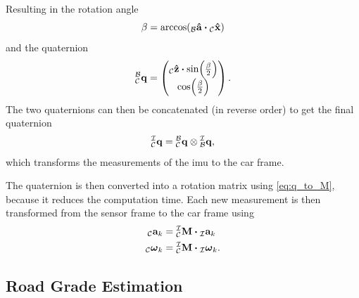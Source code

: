 Resulting in the rotation angle
\begin{equation}
	\beta = \arccos(\vincs{\vu{a}}{b} \vdot \vincs{\hat{x}}{c})
\end{equation}
and the quaternion
\begin{equation}
	\qtf{b}{c} =
	\begin{pmatrix}
		\vincs{\hat{z}}{c}\vdot\sin(\frac{\beta}{2}) \\
		\cos(\frac{\beta}{2})
	\end{pmatrix}.
\end{equation}
The two quaternions can then be concatenated (in reverse order) to get the final quaternion
\begin{equation}
	\qtf{i}{c} = \qtf{b}{c} \otimes  \qtf{i}{b},
\end{equation}
which transforms the measurements of the \gls{imu} to the car frame.\par
The quaternion is then converted into a rotation matrix using \cref{eq:q_to_M}, because it reduces the computation time.
Each new measurement is then transformed from the sensor frame to the car frame using
\begin{align}
	{}_{\mathcal{C}}\mathbf{a}_k                   & = \mtf{i}{c} \vdot {}_{\mathcal{I}}\mathbf{a}_k                    \\
	{}_{\mathcal{C}}\mathbf{\boldsymbol{\omega}}_k & = \mtf{i}{c} \vdot {}_{\mathcal{I}}\mathbf{\boldsymbol{\omega}}_k.
\end{align}


\subsection{Road Grade Estimation}
\label{ssec:road_grade_estimation_imu}
